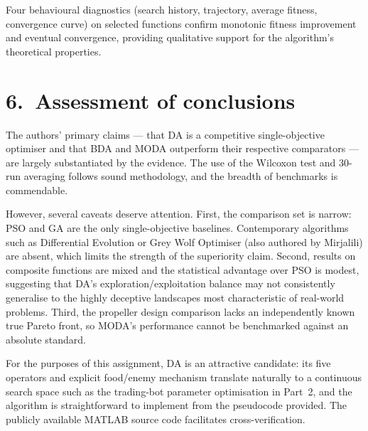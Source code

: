 \documentclass[11pt,a4paper]{article}
\begin{document}
Four behavioural diagnostics (search history, trajectory, average fitness, convergence curve) on selected functions confirm monotonic fitness improvement and eventual convergence, providing qualitative support for the algorithm's theoretical properties.

\bigskip

\section*{6.\ Assessment of conclusions}

The authors' primary claims --- that DA is a competitive single-objective optimiser and that BDA and MODA outperform their respective comparators --- are largely substantiated by the evidence.
The use of the Wilcoxon test and 30-run averaging follows sound methodology, and the breadth of benchmarks is commendable.

However, several caveats deserve attention.
First, the comparison set is narrow: PSO and GA are the only single-objective baselines.
Contemporary algorithms such as Differential Evolution or Grey Wolf Optimiser (also authored by Mirjalili) are absent, which limits the strength of the superiority claim.
Second, results on composite functions are mixed and the statistical advantage over PSO is modest, suggesting that DA's exploration/exploitation balance may not consistently generalise to the highly deceptive landscapes most characteristic of real-world problems.
Third, the propeller design comparison lacks an independently known true Pareto front, so MODA's performance cannot be benchmarked against an absolute standard.

For the purposes of this assignment, DA is an attractive candidate: its five operators and explicit food/enemy mechanism translate naturally to a continuous search space such as the trading-bot parameter optimisation in Part~2, and the algorithm is straightforward to implement from the pseudocode provided.
The publicly available MATLAB source code facilitates cross-verification.
\end{document}
